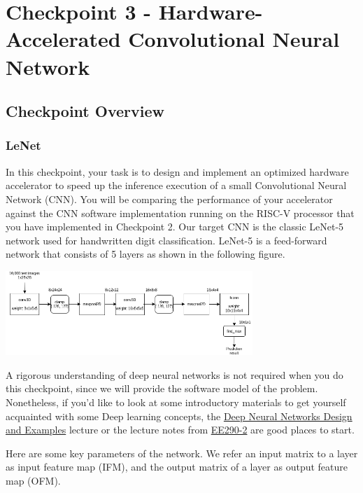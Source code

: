 \documentclass[11pt]{article}
\begin{document}
\pagebreak

\section{Checkpoint 3 - Hardware-Accelerated Convolutional Neural Network}

\subsection{Checkpoint Overview}

\subsubsection{LeNet}

In this checkpoint, your task is to design and implement an optimized hardware accelerator to speed up the inference execution of a small Convolutional Neural Network (CNN). You will be comparing the performance of your accelerator against the CNN software implementation running on the RISC-V processor that you have implemented in Checkpoint 2. Our target CNN is the classic LeNet-5 network used for handwritten digit classification. LeNet-5 is a feed-forward network that consists of 5 layers as shown in the following figure.

\begin{center}
\includegraphics[width=0.7\textwidth]{images/lenet.png}
\end{center}

A rigorous understanding of deep neural networks is not required when you do this checkpoint, since we will provide the software model of the problem. Nonetheless, if you'd like to look at some introductory materials to get yourself acquainted with some Deep learning concepts, the \href{https://inst.eecs.berkeley.edu/~eecs151/sp21/files/EECS251Leture-JennyHuang_2021.pdf}{Deep Neural Networks Design and Examples} lecture or the lecture notes from \href{https://inst.eecs.berkeley.edu//~ee290-2/sp21/}{EE290-2} are good places to start.

Here are some key parameters of the network. We refer an input matrix to a layer as input feature map (IFM), and the output matrix of a layer as output feature map (OFM).
\end{document}
